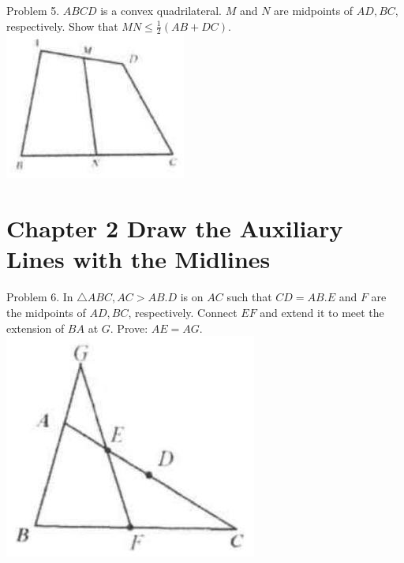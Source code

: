 \documentclass[10pt]{article}
\begin{document}
Problem 5. \(A B C D\) is a convex quadrilateral. \(M\) and \(N\) are midpoints of \(A D, B C\), respectively. Show that \(M N \leq \frac{1}{2}(A B+D C)\).\\
\includegraphics[max width=\textwidth, center]{2025_04_17_97bc1f7e44d93c271a88g-044(4)}

\section*{Chapter 2 Draw the Auxiliary Lines with the Midlines}
Problem 6. In \(\triangle A B C, A C>A B . D\) is on \(A C\) such that \(C D=A B . E\) and \(F\) are the midpoints of \(A D, B C\), respectively. Connect \(E F\) and extend it to meet the extension of \(B A\) at \(G\). Prove: \(A E=A G\).\\
\includegraphics[max width=\textwidth, center]{2025_04_17_97bc1f7e44d93c271a88g-045(1)}
\end{document}
